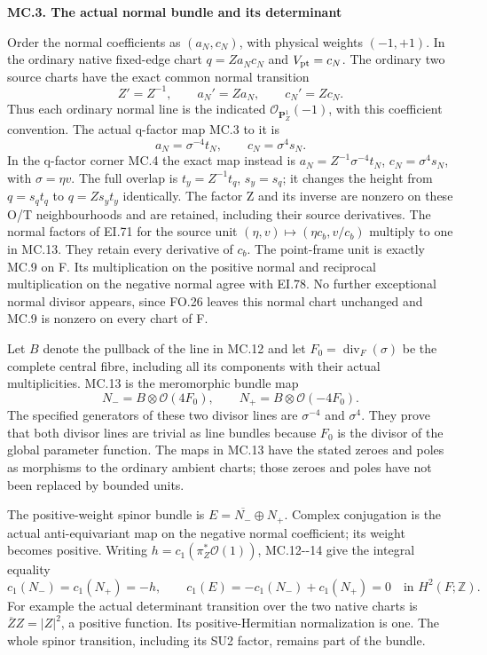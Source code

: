 \par

\medskip\noindent\textbf{MC.3. The actual normal bundle and its determinant}

\par\nobreak

Order the normal coefficients as \((a_N,c_N)\), with physical
weights \((-1,+1)\). In the ordinary native fixed-edge chart
\(q=Za_Nc_N\) and \(V_{\rm pt}=c_N\). The ordinary two
source charts have the exact common normal transition
\[
 Z'=Z^{-1},\qquad a_N'=Za_N,\qquad c_N'=Zc_N.            \tag{MC.12}
\]
Thus each ordinary normal line is the indicated
\(\mathcal O_{\mathbf P^1_Z}(-1)\), with this coefficient
convention. The actual q-factor map MC.3 to it is
\[
 a_N=\sigma^{-4}t_N,
 \qquad c_N=\sigma^4s_N.                               \tag{MC.13}
\]
In the q-factor corner MC.4 the exact map instead is
\(a_N=Z^{-1}\sigma^{-4}t_N\), \(c_N=\sigma^4s_N\),
with \(\sigma=\eta v\). The full overlap is
\(t_y=Z^{-1}t_q\), \(s_y=s_q\); it changes the height
from \(q=s_qt_q\) to \(q=Zs_yt_y\) identically.
The factor Z and its inverse are nonzero on these O/T
neighbourhoods and are retained, including their source
derivatives. The normal factors of EI.71 for the
source unit \((\eta,v)\mapsto(\eta c_b,v/c_b)\) multiply
to one in MC.13. They retain every derivative of \(c_b\).
The point-frame unit is exactly MC.9 on F. Its multiplication
on the positive normal and reciprocal multiplication on the
negative normal agree with EI.78. No further exceptional
normal divisor appears, since FO.26 leaves this normal
chart unchanged and MC.9 is nonzero on every chart of F.

Let \(B\) denote the pullback of the line in MC.12 and
let \(F_0=\operatorname{div}_F(\sigma)\) be the complete
central fibre, including all its components with their
actual multiplicities. MC.13 is the meromorphic bundle map
\[
 N_-=B\otimes\mathcal O(4F_0),
 \qquad N_+=B\otimes\mathcal O(-4F_0).                  \tag{MC.14}
\]
The specified generators of these two divisor lines are
\(\sigma^{-4}\) and \(\sigma^4\). They prove that both
divisor lines are trivial as line bundles because \(F_0\)
is the divisor of the global parameter function. The maps
in MC.13 have the stated zeroes and poles as morphisms to
the ordinary ambient charts; those zeroes and poles have
not been replaced by bounded units.

The positive-weight spinor bundle is
\(E=\overline{N_-}\oplus N_+\). Complex conjugation is
the actual anti-equivariant map on the negative normal
coefficient; its weight becomes positive. Writing
\(h=c_1(\pi_Z^*\mathcal O(1))\), MC.12-\/-14 give the
integral equality
\[
 c_1(N_-)=c_1(N_+)=-h,
 \qquad c_1(E)=-c_1(N_-)+c_1(N_+)=0\quad\text{in }H^2(F;\mathbb Z).
                                                        \tag{MC.15}
\]
For example the actual determinant transition over the
two native charts is \(\overline Z Z=|Z|^2\), a positive
function. Its positive-Hermitian normalization is one.
The whole spinor transition, including its SU2 factor,
remains part of the bundle.

